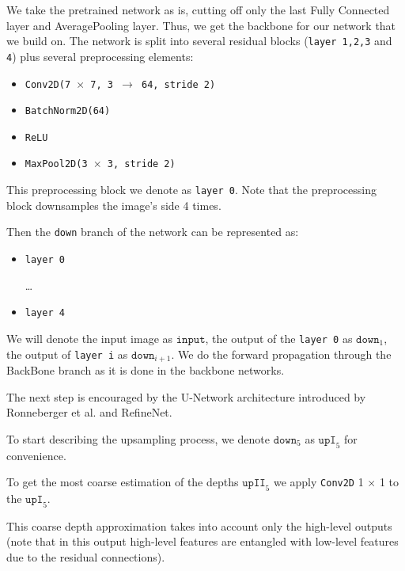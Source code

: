 \documentclass[10pt,twocolumn,letterpaper]{article}
\begin{document}
We take the pretrained network as is, cutting off only the last Fully Connected layer
and AveragePooling layer. Thus, we get the backbone for our network that
we build on. The network is split into several residual blocks
(\texttt{layer 1,2,3} and \texttt{4}) plus several preprocessing elements:

\begin{itemize}
  \item \texttt{Conv2D(7 $\times$ 7, 3 $\rightarrow$ 64, stride 2)}
  \item \texttt{BatchNorm2D(64)}
  \item \texttt{ReLU}
  \item \texttt{MaxPool2D(3 $\times$ 3, stride 2)}
\end{itemize}

This preprocessing block we denote as \texttt{layer 0}. Note that the preprocessing block
downsamples the image's side 4 times.


Then the \texttt{down} branch of the network can be represented as:
\begin{itemize}
  \item \texttt{layer 0}
  
  \dots
  
  \item \texttt{layer 4}
\end{itemize}

We will denote the input image as $\texttt{input}$, the output of the
\texttt{layer 0} as $\texttt{down}_1$, 
the output of \texttt{layer i} as $\texttt{down}_{i+1}$.
We do the forward propagation through the BackBone branch as it is done in 
the backbone networks.

The next step is encouraged by the U-Network architecture introduced by
Ronneberger et al. \cite{ronneberger2015u} and RefineNet.

To start describing the upsampling process, we denote $\texttt{down}_5$
as $\texttt{upI}_5$ for convenience.

To get the most coarse estimation of the depths $\texttt{upII}_5$
we apply \texttt{Conv2D} 1 $\times$ 1 to the $\texttt{upI}_5$.

This coarse depth approximation takes into account
only the high-level outputs (note that in this output high-level features
are entangled with low-level features due to the residual connections).
\end{document}
